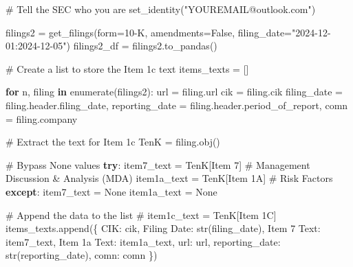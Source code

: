 \documentclass[
  letterpaper,
  DIV=11,
  numbers=noendperiod]{scrreprt}
\newenvironment{Shaded}{\begin{snugshade}}{\end{snugshade}}
\newcommand{\BuiltInTok}[1]{\textcolor[rgb]{0.00,0.23,0.31}{#1}}
\newcommand{\CommentTok}[1]{\textcolor[rgb]{0.37,0.37,0.37}{#1}}
\newcommand{\ControlFlowTok}[1]{\textcolor[rgb]{0.00,0.23,0.31}{\textbf{#1}}}
\newcommand{\KeywordTok}[1]{\textcolor[rgb]{0.00,0.23,0.31}{\textbf{#1}}}
\newcommand{\NormalTok}[1]{\textcolor[rgb]{0.00,0.23,0.31}{#1}}
\newcommand{\OperatorTok}[1]{\textcolor[rgb]{0.37,0.37,0.37}{#1}}
\newcommand{\StringTok}[1]{\textcolor[rgb]{0.13,0.47,0.30}{#1}}
\newcommand{\VariableTok}[1]{\textcolor[rgb]{0.07,0.07,0.07}{#1}}
\begin{document}
\begin{Shaded}
\begin{Highlighting}[]
\CommentTok{\# Tell the SEC who you are}
\NormalTok{set\_identity(}\StringTok{"YOUREMAIL@outlook.com"}\NormalTok{)}
\end{Highlighting}
\end{Shaded}

\begin{Shaded}
\begin{Highlighting}[]
\NormalTok{filings2 }\OperatorTok{=}\NormalTok{ get\_filings(form}\OperatorTok{=}\StringTok{\textquotesingle{}10{-}K\textquotesingle{}}\NormalTok{, amendments}\OperatorTok{=}\VariableTok{False}\NormalTok{, filing\_date}\OperatorTok{=}\StringTok{"2024{-}12{-}01:2024{-}12{-}05"}\NormalTok{)}
\NormalTok{filings2\_df }\OperatorTok{=}\NormalTok{ filings2.to\_pandas()}

\CommentTok{\# Create a list to store the Item 1c text}
\NormalTok{items\_texts }\OperatorTok{=}\NormalTok{ []}

\ControlFlowTok{for}\NormalTok{ n, filing }\KeywordTok{in} \BuiltInTok{enumerate}\NormalTok{(filings2):}
\NormalTok{    url }\OperatorTok{=}\NormalTok{ filing.url}
\NormalTok{    cik }\OperatorTok{=}\NormalTok{ filing.cik}
\NormalTok{    filing\_date }\OperatorTok{=}\NormalTok{ filing.header.filing\_date,}
\NormalTok{    reporting\_date }\OperatorTok{=}\NormalTok{ filing.header.period\_of\_report,}
\NormalTok{    comn }\OperatorTok{=}\NormalTok{ filing.company}

    \CommentTok{\# Extract the text for Item 1c}
\NormalTok{    TenK }\OperatorTok{=}\NormalTok{ filing.obj()}
    
    \CommentTok{\# Bypass None values}
    \ControlFlowTok{try}\NormalTok{:}
\NormalTok{        item7\_text }\OperatorTok{=}\NormalTok{ TenK[}\StringTok{\textquotesingle{}Item 7\textquotesingle{}}\NormalTok{] }\CommentTok{\# Management Discussion \& Analysis (MDA)}
\NormalTok{        item1a\_text }\OperatorTok{=}\NormalTok{ TenK[}\StringTok{\textquotesingle{}Item 1A\textquotesingle{}}\NormalTok{] }\CommentTok{\# Risk Factors }
    \ControlFlowTok{except}\NormalTok{:}
\NormalTok{        item7\_text }\OperatorTok{=} \VariableTok{None}
\NormalTok{        item1a\_text }\OperatorTok{=} \VariableTok{None}

    \CommentTok{\# Append the data to the list}
    \CommentTok{\# item1c\_text = TenK[\textquotesingle{}Item 1C\textquotesingle{}]}
\NormalTok{    items\_texts.append(\{}
        \StringTok{\textquotesingle{}CIK\textquotesingle{}}\NormalTok{: cik,}
        \StringTok{\textquotesingle{}Filing Date\textquotesingle{}}\NormalTok{: }\BuiltInTok{str}\NormalTok{(filing\_date),}
        \StringTok{\textquotesingle{}Item 7 Text\textquotesingle{}}\NormalTok{: item7\_text,}
        \StringTok{\textquotesingle{}Item 1a Text\textquotesingle{}}\NormalTok{: item1a\_text,}
        \StringTok{\textquotesingle{}url\textquotesingle{}}\NormalTok{: url,}
        \StringTok{\textquotesingle{}reporting\_date\textquotesingle{}}\NormalTok{: }\BuiltInTok{str}\NormalTok{(reporting\_date),}
        \StringTok{\textquotesingle{}comn\textquotesingle{}}\NormalTok{: comn}
\NormalTok{    \})}


\end{Highlighting}
\end{Shaded}
\end{document}
